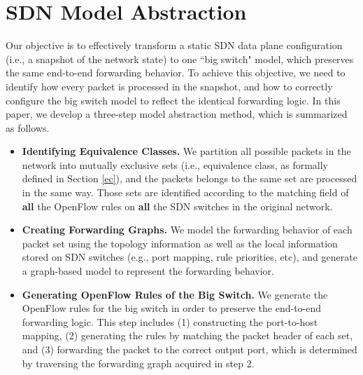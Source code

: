 \section{SDN Model Abstraction}
\label{Sec:Design}

Our objective is to effectively transform a static SDN data plane configuration (i.e., a snapshot of the network state) to one ``big switch" model, which preserves the same end-to-end forwarding behavior. %
To achieve this objective, we need to identify how every packet is processed in the snapshot, and how to correctly configure the big switch model to reflect the identical forwarding logic. In this paper, we develop a three-step model abstraction method, which is summarized as follows.

\begin{itemize}
\item \textbf{Identifying Equivalence Classes.} We partition all possible packets in the network into mutually exclusive sets (i.e., equivalence class, as formally defined in Section \ref{ec}), and the packets belongs to the same set are processed in the same way. Those sets are identified according to the matching field of \textbf{all} the OpenFlow rules on \textbf{all} the SDN switches in the original network.

\item \textbf{Creating Forwarding Graphs.} We model the forwarding behavior of each packet set using the topology information as well as the local information stored on SDN switches (e.g., port mapping, rule priorities, etc), and generate a graph-based model to represent the forwarding behavior.  
\item \textbf{Generating OpenFlow Rules of the Big Switch.} We generate the OpenFlow rules for the big switch in order to preserve the end-to-end forwarding logic. This step includes (1) constructing the port-to-host mapping, (2) generating the rules by matching the packet header of each set,  and (3) forwarding the packet to the correct output port, which is determined by traversing the forwarding graph acquired in step 2.
\end{itemize}


